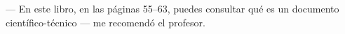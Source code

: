 \documentclass{article}
\begin{document}
--- En este libro, en las páginas 55--63, puedes consultar qué es un 
documento científico-técnico --- me recomendó el profesor.
\end{document}
